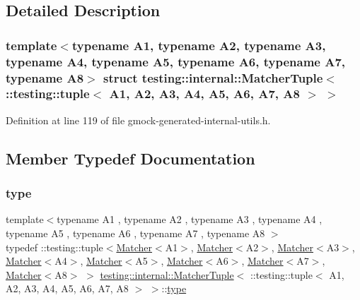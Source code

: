 \subsection{Detailed Description}
\subsubsection*{template$<$typename A1, typename A2, typename A3, typename A4, typename A5, typename A6, typename A7, typename A8$>$\newline
struct testing\+::internal\+::\+Matcher\+Tuple$<$ \+::testing\+::tuple$<$ A1, A2, A3, A4, A5, A6, A7, A8 $>$ $>$}



Definition at line 119 of file gmock-\/generated-\/internal-\/utils.\+h.



\subsection{Member Typedef Documentation}
\mbox{\label{structtesting_1_1internal_1_1MatcherTuple_3_01_1_1testing_1_1tuple_3_01A1_00_01A2_00_01A3_00_01Aed2bba98e2ef5f11a8df3506707ec6d8_a17186b5ae808ec16b84eb4022ab7a089}} 
\subsubsection{\texorpdfstring{type}{type}}
{\footnotesize\ttfamily template$<$typename A1 , typename A2 , typename A3 , typename A4 , typename A5 , typename A6 , typename A7 , typename A8 $>$ \\
typedef \+::testing\+::tuple$<$\hyperlink{classtesting_1_1Matcher}{Matcher}$<$A1$>$, \hyperlink{classtesting_1_1Matcher}{Matcher}$<$A2$>$, \hyperlink{classtesting_1_1Matcher}{Matcher}$<$A3$>$, \hyperlink{classtesting_1_1Matcher}{Matcher}$<$A4$>$, \hyperlink{classtesting_1_1Matcher}{Matcher}$<$A5$>$, \hyperlink{classtesting_1_1Matcher}{Matcher}$<$A6$>$, \hyperlink{classtesting_1_1Matcher}{Matcher}$<$A7$>$, \hyperlink{classtesting_1_1Matcher}{Matcher}$<$A8$>$ $>$ \hyperlink{structtesting_1_1internal_1_1MatcherTuple}{testing\+::internal\+::\+Matcher\+Tuple}$<$ \+::testing\+::tuple$<$ A1, A2, A3, A4, A5, A6, A7, A8 $>$ $>$\+::\hyperlink{structtesting_1_1internal_1_1MatcherTuple_3_01_1_1testing_1_1tuple_3_01A1_00_01A2_00_01A3_00_01Aed2bba98e2ef5f11a8df3506707ec6d8_a17186b5ae808ec16b84eb4022ab7a089}{type}}



